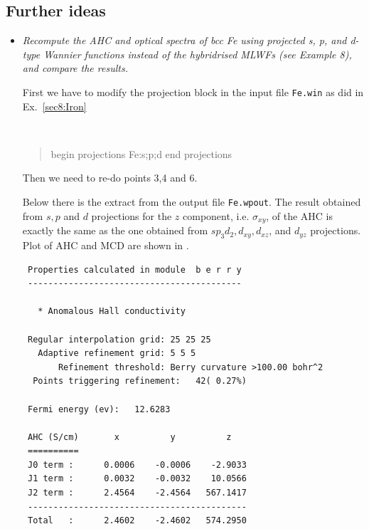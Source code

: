 \subsection*{Further ideas}
\begin{itemize}
	\item {\it Recompute the AHC and optical spectra of bcc Fe using projected s, p, and d-type Wannier
functions instead of the hybridrised MLWFs (see Example 8), and compare the results.}

First we have to modify the projection block in the input file {\tt Fe.win} as did in Ex.~\ref{sec8:Iron}

{\tt
\begin{quote}
begin projections
Fe:s;p;d
end projections
\end{quote}
}

Then we need to re-do points 3,4 and 6.

Below there is the extract from the output file {\tt Fe.wpout}. The result obtained from $s,p$ and $d$ projections for the $z$ component, i.e. $\sigma_{xy}$, of the AHC is exactly the same as the one obtained from $sp_3d_2,d_{xy},d_{xz}$, and $d_{yz}$ projections. Plot of AHC and MCD are shown in .
	{\small
	\begin{tcolorbox}[title=With adaptive refinement,sharp corners,boxrule=0.5pt]
	\begin{verbatim}
 Properties calculated in module  b e r r y
 ------------------------------------------

   * Anomalous Hall conductivity

 Regular interpolation grid: 25 25 25
   Adaptive refinement grid: 5 5 5
       Refinement threshold: Berry curvature >100.00 bohr^2
  Points triggering refinement:   42( 0.27%)

 Fermi energy (ev):   12.6283

 AHC (S/cm)       x          y          z
 ==========
 J0 term :      0.0006    -0.0006    -2.9033
 J1 term :      0.0032    -0.0032    10.0566
 J2 term :      2.4564    -2.4564   567.1417
 -------------------------------------------
 Total   :      2.4602    -2.4602   574.2950

	\end{verbatim}
	\end{tcolorbox}
	}


\end{itemize}
